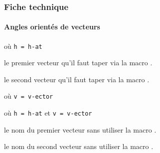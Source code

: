 \documentclass[12pt,a4paper]{article}
\begin{document}


\subsubsection{Fiche technique}

\paragraph{Angles orientés de vecteurs}


  où \quad \verb+h = h-at+

 le premier vecteur qu'il faut taper via la macro .

 le second vecteur qu'il faut taper via la macro .


\separation


 où \quad \verb+v = v-ector+

 où \quad \verb+h = h-at+ et \verb+v = v-ector+

 le nom du premier vecteur sans utiliser la macro .

 le nom du second vecteur sans utiliser la macro .
\end{document}
